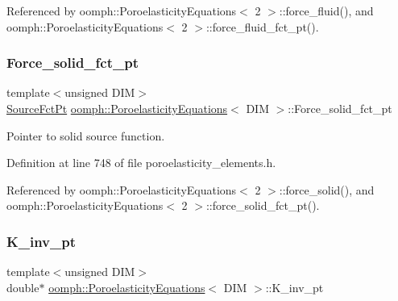 Referenced by oomph\+::\+Poroelasticity\+Equations$<$ 2 $>$\+::force\+\_\+fluid(), and oomph\+::\+Poroelasticity\+Equations$<$ 2 $>$\+::force\+\_\+fluid\+\_\+fct\+\_\+pt().

\mbox{\label{classoomph_1_1PoroelasticityEquations_a34751c6bb84f239c56b504eec3cae3a0}} 
\subsubsection{\texorpdfstring{Force\+\_\+solid\+\_\+fct\+\_\+pt}{Force\_solid\_fct\_pt}}
{\footnotesize\ttfamily template$<$unsigned D\+IM$>$ \\
\hyperlink{classoomph_1_1PoroelasticityEquations_a234bc29fbd4c3255ef903a3cb5f6361f}{Source\+Fct\+Pt} \hyperlink{classoomph_1_1PoroelasticityEquations}{oomph\+::\+Poroelasticity\+Equations}$<$ D\+IM $>$\+::Force\+\_\+solid\+\_\+fct\+\_\+pt\hspace{0.3cm}{\ttfamily [private]}}



Pointer to solid source function. 



Definition at line 748 of file poroelasticity\+\_\+elements.\+h.



Referenced by oomph\+::\+Poroelasticity\+Equations$<$ 2 $>$\+::force\+\_\+solid(), and oomph\+::\+Poroelasticity\+Equations$<$ 2 $>$\+::force\+\_\+solid\+\_\+fct\+\_\+pt().

\mbox{\label{classoomph_1_1PoroelasticityEquations_ae686ea7c8589338ea0a6246fed8dac6f}} 
\subsubsection{\texorpdfstring{K\+\_\+inv\+\_\+pt}{K\_inv\_pt}}
{\footnotesize\ttfamily template$<$unsigned D\+IM$>$ \\
double$\ast$ \hyperlink{classoomph_1_1PoroelasticityEquations}{oomph\+::\+Poroelasticity\+Equations}$<$ D\+IM $>$\+::K\+\_\+inv\+\_\+pt\hspace{0.3cm}{\ttfamily [private]}}



